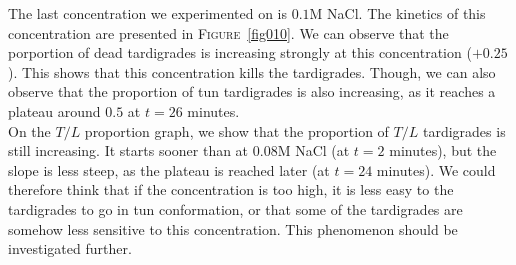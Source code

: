 \documentclass[12pt,a4paper, twocolumn]{article}
\begin{document}
The last concentration we experimented on is $0.1$M NaCl.  The kinetics of this concentration are presented in \textsc{Figure}~\ref{fig010}. We can observe that the porportion of dead tardigrades is increasing strongly at this concentration ($+0.25$). This shows that this concentration kills the tardigrades. Though, we can also observe that the proportion of tun tardigrades is also increasing, as it reaches a plateau around $0.5$ at $t=26$ minutes.\\
On the $T/L$ proportion graph, we show that the proportion of $T/L$ tardigrades is still increasing. It starts sooner than at $0.08$M NaCl (at $t=2$ minutes), but the slope is less steep, as the plateau is reached later (at $t=24$ minutes). We could therefore think that if the concentration is too high, it is less easy to the tardigrades to go in tun conformation, or that some of the tardigrades are somehow less sensitive to this concentration. This phenomenon should be investigated further.
\end{document}
